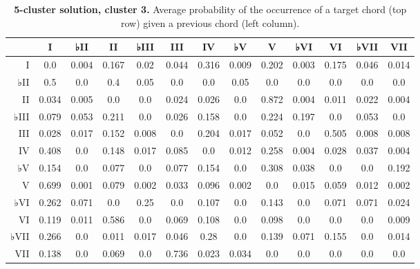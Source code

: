 \begin{table}[htbp]
\begin{minipage}{\linewidth}
\setlength{\tymax}{0.5\linewidth}
\centering
\small
\caption{\textbf{5-cluster solution, cluster 3.} Average probability of the occurrence of a target chord (top row) given a previous chord (left column).}
\label{5-clustersolutioncluster3.averageprobabilityoftheoccurrenceofatargetchordtoprowgivenapreviouschordleftcolumn.}
\begin{tabulary}{\textwidth}{@{}RCCCCCCCCCCCC@{}} \toprule
&I&♭II&II&♭III&III&IV&♭V&V&♭VI&VI&♭VII&VII\\
\midrule
I&0.0&0.004&0.167&0.02&0.044&0.316&0.009&0.202&0.003&0.175&0.046&0.014\\
♭II&0.5&0.0&0.4&0.05&0.0&0.0&0.05&0.0&0.0&0.0&0.0&0.0\\
II&0.034&0.005&0.0&0.0&0.024&0.026&0.0&0.872&0.004&0.011&0.022&0.004\\
♭III&0.079&0.053&0.211&0.0&0.026&0.158&0.0&0.224&0.197&0.0&0.053&0.0\\
III&0.028&0.017&0.152&0.008&0.0&0.204&0.017&0.052&0.0&0.505&0.008&0.008\\
IV&0.408&0.0&0.148&0.017&0.085&0.0&0.012&0.258&0.004&0.028&0.037&0.004\\
♭V&0.154&0.0&0.077&0.0&0.077&0.154&0.0&0.308&0.038&0.0&0.0&0.192\\
V&0.699&0.001&0.079&0.002&0.033&0.096&0.002&0.0&0.015&0.059&0.012&0.002\\
♭VI&0.262&0.071&0.0&0.25&0.0&0.107&0.0&0.143&0.0&0.071&0.071&0.024\\
VI&0.119&0.011&0.586&0.0&0.069&0.108&0.0&0.098&0.0&0.0&0.0&0.009\\
♭VII&0.266&0.0&0.011&0.017&0.046&0.28&0.0&0.139&0.071&0.155&0.0&0.014\\
VII&0.138&0.0&0.069&0.0&0.736&0.023&0.034&0.0&0.0&0.0&0.0&0.0\\

\bottomrule

\end{tabulary}
\end{minipage}
\end{table}

